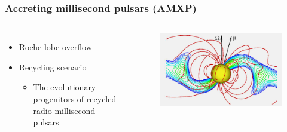 \documentclass{beamer}
\begin{document}
\begin{frame}
\frametitle{Accreting millisecond pulsars (AMXP)}
\begin{columns}[c] %

\begin{itemize}
\item Roche lobe overflow
\item Recycling scenario
\begin{itemize}
\item The evolutionary progenitors of recycled radio millisecond pulsars%
\end{itemize}

\end{itemize}


\begin{figure}
\includegraphics[width=1.1\linewidth]{schematic.jpg}
\end{figure}

\end{columns}
\end{frame}

\end{document}
